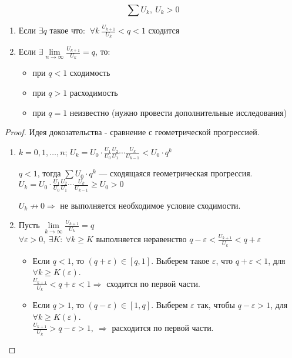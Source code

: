 \begin{theorem}
  $$\sum U_k, \ U_k > 0$$
  \begin{enumerate}
    \item Если $\exists q$ такое что:
      $\ \forall k \ \frac{U_{k+1}}{U_k} < q < 1$ сходится
    \item Если $\exists \lim\limits_{n \to \infty} \frac{U_{k+1}}{U_k} = q$, то:
    \begin{itemize}
      \item при $q < 1$ сходимость
      \item при $q > 1$ расходимость
      \item при $q = 1$ неизвестно (нужно провести дополнительные исследования)
    \end{itemize}
  \end{enumerate}
\end{theorem}

\begin{proof}
  Идея докозательства - сравнение с геометрической прогрессией.
  \begin{enumerate}
    \item $k = 0, 1, \dots, n$;
      $U_k = U_0 \cdot \frac{U_1}{U_0} \frac{U_2}{U_1} \cdots \frac{U_k}{U_{k-1}}
      < U_0 \cdot q^k$
      \begin{comment}
        $\frac{U_k}{U_{k-1}} < q, \ \forall k$
      \end{comment}
      $q < 1$, тогда $\sum U_0 \cdot q^k$ --- сходящаяся геометрическая прогрессия. \\
      $U_k = U_0 \cdot \frac{U_1}{U_0}\frac{U_2}{U_1}\cdots\frac{U_k}{U_{k-1}}
      \geq U_0 > 0$
      \begin{comment}
        $\frac{U_k}{U_{k-1}} \geq 1, \ \forall k$
      \end{comment}
      $U_k \not \to 0 \Rightarrow$ не выполняется необходимое условие сходимости.
    \item Пусть $\lim\limits_{k \to \infty} \frac{U_{k+1}}{U_k} = q$ \\
      $\forall \varepsilon > 0, \ \exists K : \ \forall k \geq K$
      выполняется неравенство
      $q - \varepsilon < \frac{U_{k+1}}{U_k} < q + \varepsilon$
      \begin{itemize}
        \item Если $q < 1$, то $(q + \varepsilon) \in [q, 1]$.
          Выберем такое $\varepsilon$, что $q + \varepsilon < 1$, для
          $\forall k \geq K(\varepsilon)$. \\
          $\frac{U_{k+1}}{U_k} < q + \varepsilon < 1 \Rightarrow$
          сходится по первой части.
        \item Если $q > 1$, то $(q - \varepsilon) \in [1, q]$.
          Выберем $\varepsilon$ так, чтобы
          $q - \varepsilon > 1$, для
          $\forall k \geq K(\varepsilon)$. \\
          $\frac{U_{k+1}}{U_k} > q - \varepsilon > 1, \ \Rightarrow$
          расходится по первой части.
      \end{itemize}
    \end{enumerate}
\end{proof}

